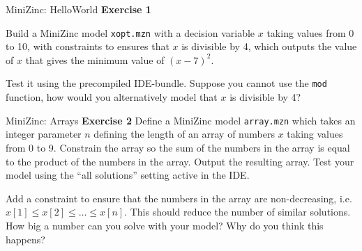 \begin{frame}{MiniZinc: HelloWorld}
\textbf{Exercise 1}

Build a MiniZinc model \texttt{xopt.mzn} with a decision variable $x$ taking values from 0 to 10, with
constraints to ensures that $x$ is divisible by 4, which outputs the value of $x$ that gives the minimum
value of $(x-7)^2$.

Test it using the precompiled IDE-bundle. Suppose you cannot use the \texttt{mod} function, how would you alternatively model that $x$
is divisible by 4?

\end{frame}

\begin{frame}{MiniZinc: Arrays}
\textbf{Exercise 2}
Define a MiniZinc model \texttt{array.mzn} which takes an integer parameter $n$ defining the length of an
array of numbers $x$ taking values from 0 to 9. Constrain the array so the sum of the numbers in
the array is equal to the product of the numbers in the array. Output the resulting array.
Test your model using the ``all solutions'' setting active in the IDE.

\vspace*{2ex}

 Add a constraint to ensure that the numbers in the array are non-decreasing, i.e. $x[1] \leq x[2] \leq
\ldots \leq x[n]$. This should reduce the number of similar solutions. 
How big a number can you solve with your model? Why do you think this happens?


\end{frame}

